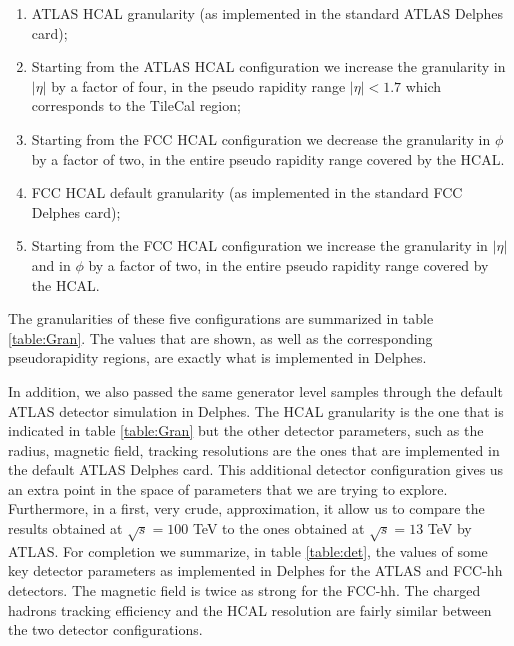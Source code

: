 \begin{enumerate}
	\item ATLAS HCAL granularity (as implemented in the standard ATLAS Delphes card);
	\item Starting from the ATLAS HCAL configuration we increase the granularity in $|\eta|$ by a factor of four, in the pseudo rapidity range $|\eta|<1.7$ which corresponds to the TileCal region;
	\item Starting from the FCC HCAL configuration we decrease the granularity in $\phi$ by a factor of two, in the entire pseudo rapidity range covered by the HCAL.
	\item FCC HCAL default granularity (as implemented in the standard FCC Delphes card);
	\item Starting from the FCC HCAL configuration we increase the granularity in $|\eta|$ and in $\phi$ by a factor of two, in the entire pseudo rapidity range covered by the HCAL.
\end{enumerate}

The granularities of these five configurations are summarized in table \ref{table:Gran}. The values that are shown, as well as the corresponding pseudorapidity regions, are exactly what is implemented in Delphes. 

In addition, we also passed the same generator level samples through the default ATLAS detector simulation in Delphes. The HCAL granularity is the one that is indicated in table \ref{table:Gran} but the other detector parameters, such as the radius, magnetic field, tracking resolutions are the ones that are implemented in the default ATLAS Delphes card. This additional detector configuration gives us an extra point in the space of parameters that we are trying to explore. Furthermore, in a first, very crude, approximation, it allow us to compare the results obtained at $\sqrt{s}=100$ TeV to the ones obtained at $\sqrt{s}=13$ TeV by ATLAS.
For completion we summarize, in table \ref{table:det}, the values of some key detector parameters as implemented in Delphes for the ATLAS and FCC-hh detectors. The magnetic field is twice as strong for the FCC-hh. The charged hadrons tracking efficiency and the HCAL resolution are fairly similar between the two detector configurations.

